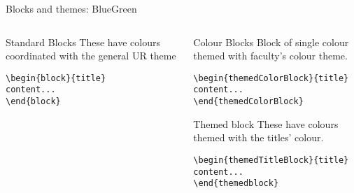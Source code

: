 \begingroup
{}
\begin{frame}[fragile]{Blocks and themes: BlueGreen}
\begin{columns} %
\begin{column}{0.3\textwidth}
\begin{block}{Standard Blocks}
These have colours coordinated with the general UR theme
\begin{verbatim}
\begin{block}{title}
content...
\end{block}
\end{verbatim}
\end{block}
\end{column}
\begin{column}{0.7\textwidth}
\begin{themedColorBlock}{Colour Blocks}
Block of single colour themed with faculty's colour theme.
\small
\begin{verbatim}
\begin{themedColorBlock}{title}
content...
\end{themedColorBlock}
\end{verbatim}
\end{themedColorBlock}
\begin{themedTitleBlock} {Themed block}
These have colours themed with the titles' colour.
\small
\begin{verbatim}
\begin{themedTitleBlock}{title}
content...
\end{themedblock}
\end{verbatim}
\end{themedTitleBlock}
\end{column}
\end{columns}
\end{frame}
\endgroup


